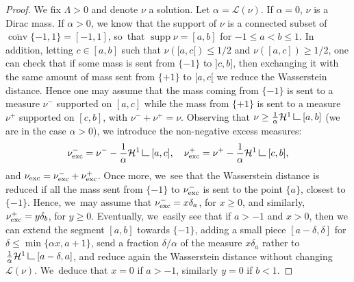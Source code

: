 \documentclass[10pt]{amsart}
\theoremstyle{definition}
\newcommand\LM[1]{\hbox{\vrule width.5pt \vbox to#1pt{\vfill \hrule width#1pt height.5pt}}}
\newcommand\LL{{\mathchoice {\>\LM7\>}{\>\LM7\>}{\,\LM5\,}{\,\LM{3.35}\,}}}
\newcommand{\mres}{\LL}
\newcommand\cH{\mathcal{H}}
\newcommand\cL{\mathcal{L}}
\DeclareMathOperator{\supp}{supp}
\DeclareMathOperator{\conv}{conv}
\newcommand{\cconv}{\overline{\conv}}
\newcommand{\nuexc}{\nu_{\textup{exc}}}
\newcommand{\ci}[2]{ \left[ #1, #2 \right] }
\begin{document}
\begin{proof}
We fix $\Lambda>0$ and denote $\nu$ a solution.
Let $\alpha=\mathcal{L}(\nu)$.
If $\alpha=0$, $\nu$ is a Dirac mass. If $\alpha>0$,
we know that the support of $\nu$ is a connected subset of
$\cconv{\{-1,1\}}=[-1,1]$, so~that $\supp\nu = [a,b]$ for $-1\le a < b\le 1$.
In addition, letting $c\in [a,b]$ such that
$\nu([a,c[)\le 1/2$ and $\nu([a,c])\ge 1/2$, one can check that
if some mass is sent from $\{-1\}$ to $]c,b]$, then exchanging it
with the same amount of mass sent from $\{+1\}$ to $[a,c[$ we reduce
the Wasserstein distance. Hence one may assume that the mass
coming from $\{-1\}$ is sent to a measure $\nu^-$ supported on $[a,c]$
while the mass from $\{+1\}$ is sent to a measure $\nu^+$ supported
on $[c,b]$, with $\nu^-+\nu^+=\nu$. Observing that $\nu\ge \frac{1}{\alpha}\cH^1\mres [a,b]$
(we are in the case $\alpha>0$),
we introduce the non-negative excess measures:
\[
\nuexc^- = \nu^- - \frac{1}{\alpha}\cH^1\mres [a,c],\quad
\nuexc^+ = \nu^+ - \frac{1}{\alpha}\cH^1\mres [c,b],
\]
and $\nuexc = \nuexc^-+\nuexc^+$. Once more, we~see that the Wasserstein
distance is reduced if all the mass sent from $\{-1\}$ to $\nuexc^-$
is sent to the point $\{a\}$, closest to $\{-1\}$. Hence, we~may assume
that $\nuexc^-= x\delta_a$, for $x\ge 0$, and similarly,
$\nuexc^+ = y\delta_b$, for $y\ge 0$. Eventually, we~easily see that
if $a>-1$ and $x>0$, then we can extend the segment $[a,b]$ towards $\{-1\}$,
adding a small piece $[a-\delta,\delta]$ for $\delta\le
\min \{\alpha x, a+1\}$, send a fraction $\delta/\alpha$ of
the measure $x\delta_{a}$ rather to $\frac{1}{\alpha}\cH^1\mres [a-\delta,a]$,
and reduce again the Wasserstein distance without changing $\mathcal{L}(\nu)$. We~deduce that $x=0$ if $a>-1$, similarly $y=0$ if $b<1$.

\newcommand{\noop}[1]{}
\noop{
Since the solutions are supported on a line segment in $\ci{-1}{1}$, they are of the form $\nu=\delta_{a}$ or
$ \nu = \frac{1}{\alpha}\cH^1\mres\ci{a}{b}+\nuexc$,
with $\alpha=\cL(\nu)$ and $\supp \nuexc \subset \ci{a}{b}\subset \ci{-1}{1}$.

Since solutions are supported on a line segment in $\ci{-1}{1}$, we~use the ansatz and assume them to be of the form
\[
\nu = \frac{1}{\alpha}\cH^1\mres\ci{a}{b}
\text{ or }
\nu = \frac{1}{\alpha}\cH^1\mres\ci{-1}{1} + c\delta_{-1} +d\delta_1.
\]
Indeed if the $[a,b]$ does not coincide with $[-1,1]$ and there is any mass left after we form the uniform measure over the segment $[a,b]$, we~enlarge a bit the segment. If $a$ or $b$ coincide with $-1,1$, we~can just leave any residual mass concentrated at the Dirac delta with no transportation cost, see for instance Lemma~\ref{lemma.minimal_distance2Sigma} below.}


\end{proof}
\end{document}
